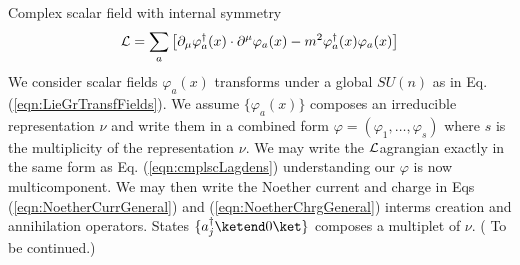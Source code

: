 Complex scalar field with internal symmetry
\begin{equation}
{\cal L} = \sum_a \left[
\partial_\mu \varphi_a^\dagger(x)\cdot \partial^\mu \varphi_a(x)
- m^2 \varphi_a^\dagger(x)\varphi_a(x)
\right]
\end{equation}
We consider scalar fields $\varphi_a(x)$ transforms under a global $SU(n)$ 
as in Eq. (\ref{eqn:LieGrTransfFields}).
We assume $\{\varphi_a(x) \}$ composes an irreducible representation $\nu$
and write them in a combined form
$\varphi = (\varphi_1, \dots, \varphi_s)$
where $s$ is the multiplicity of the representation $\nu$.
We may write the ${\cal L}$agrangian exactly in the same form as
Eq. (\ref{eqn:cmplscLagdens})
understanding our $\varphi$ is now multicomponent.
We may then write the Noether current and charge in Eqs (\ref{eqn:NoetherCurrGeneral}) 
and (\ref{eqn:NoetherChrgGeneral}) interms creation and annihilation operators.
States $\{ a^\dagger_j \ketend 0 \ket \}$ composes a multiplet of $\nu$.
( To be continued.)